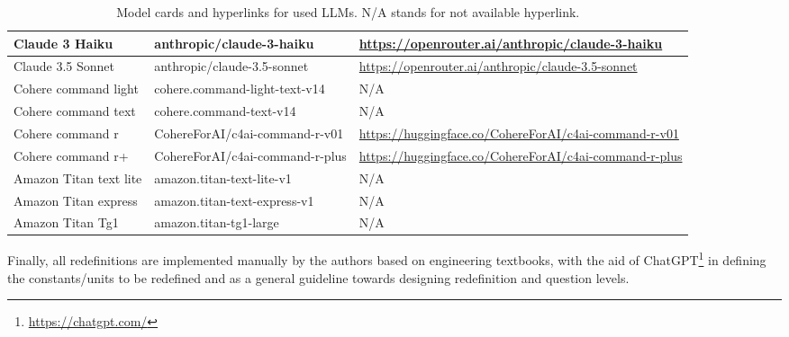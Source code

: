 \begin{table*}[h!]
\begin{tabular}{p{3.4cm}|p{4.7cm}p{6.7cm}}
Claude 3 Haiku & anthropic/claude-3-haiku & \href{https://openrouter.ai/anthropic/claude-3-haiku}{https://openrouter.ai/anthropic/claude-3-haiku}\\\hline
Claude 3.5 Sonnet & anthropic/claude-3.5-sonnet & \href{https://openrouter.ai/anthropic/claude-3.5-sonnet}{https://openrouter.ai/anthropic/claude-3.5-sonnet} \\\hline
Cohere command light & cohere.command-light-text-v14 & N/A\\\hline
Cohere command text& cohere.command-text-v14 & N/A\\\hline
Cohere command r & CohereForAI/c4ai-command-r-v01 & \href{https://huggingface.co/CohereForAI/c4ai-command-r-v01}{https://huggingface.co/CohereForAI/c4ai-command-r-v01} 
\\\hline
Cohere command r+ & CohereForAI/c4ai-command-r-plus & \href{https://huggingface.co/CohereForAI/c4ai-command-r-plus}{https://huggingface.co/CohereForAI/c4ai-command-r-plus}
\\\hline
Amazon Titan text lite & amazon.titan-text-lite-v1 & N/A \\\hline
Amazon Titan express & amazon.titan-text-express-v1 & N/A \\\hline
Amazon Titan Tg1 & amazon.titan-tg1-large & N/A \\
\hline
    \end{tabular}
    \caption{Model cards and hyperlinks for used LLMs. N/A stands for not available hyperlink.}
    \label{tab:model-cards}
\end{table*}

Finally, all redefinitions are implemented manually by the authors based on engineering textbooks, with the aid of ChatGPT\footnote{\href{https://chatgpt.com/}{https://chatgpt.com/}} in defining the constants/units to be redefined and as a general guideline towards designing redefinition and question levels. 